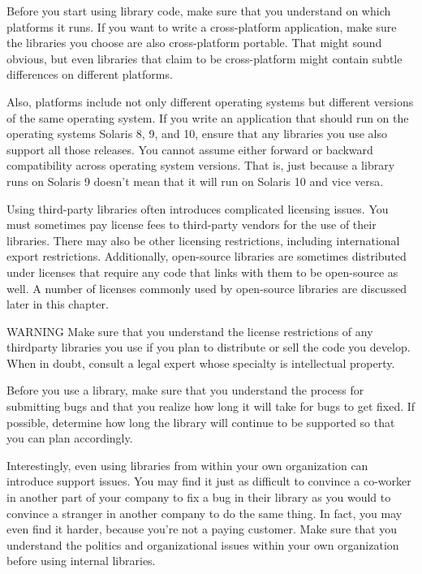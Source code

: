 
Before you start using library code, make sure that you understand on which platforms it runs. If you want to write a cross-platform application, make sure the libraries you choose are also cross-platform portable. That might sound obvious, but even libraries that claim to be cross-platform might contain subtle differences on different platforms.

Also, platforms include not only different operating systems but different versions of the same operating system. If you write an application that should run on the operating systems Solaris 8, 9, and 10, ensure that any libraries you use also support all those releases. You cannot assume either forward or backward compatibility across operating system versions. That is, just because a library runs on Solaris 9 doesn’t mean that it will run on Solaris 10 and vice versa.


Using third-party libraries often introduces complicated licensing issues. You must sometimes pay license fees to third-party vendors for the use of their libraries. There may also be other licensing restrictions, including international export restrictions. Additionally, open-source libraries are sometimes distributed under licenses that require any code that links with them to be open-source as well.
A number of licenses commonly used by open-source libraries are discussed later in this chapter.

\begin{myWarning}{WARNING}
Make sure that you understand the license restrictions of any thirdparty libraries you use if you plan to distribute or sell the code you develop. When in doubt, consult a legal expert whose specialty is intellectual property.
\end{myWarning}


Before you use a library, make sure that you understand the process for submitting bugs and that you realize how long it will take for bugs to get fixed. If possible, determine how long the library will continue to be supported so that you can plan accordingly.

Interestingly, even using libraries from within your own organization can introduce support issues. You may find it just as difficult to convince a co-worker in another part of your company to fix a bug in their library as you would to convince a stranger in another company to do the same thing. In fact, you may even find it harder, because you’re not a paying customer. Make sure that you understand the politics and organizational issues within your own organization before using internal libraries.

